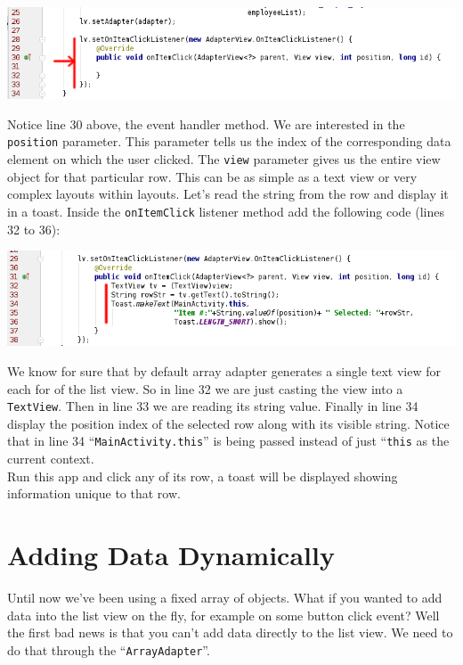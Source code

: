 \begin{center}
	\includegraphics[scale=0.4]{chapters/ch10/images/28}
\end{center}

Notice line 30 above, the event handler method. We are interested in the \texttt{position} parameter. This parameter tells us the index of the corresponding data element on which the user clicked. The \texttt{view} parameter gives us the entire view object for that particular row. This can be as simple as a text view or very complex layouts within layouts. Let's read the string from the row and display it in a toast. Inside the \texttt{onItemClick} listener method add the following code (lines 32 to 36):

\begin{center}
	\includegraphics[scale=0.4]{chapters/ch10/images/29}
\end{center}

We know for sure that by default array adapter generates a single text view for each for of the list view. So in line 32 we are just casting the view into a \texttt{TextView}. Then in line 33 we are reading its string value. Finally in line 34 display the position index of the selected row along with its visible string. Notice that in line 34 ``\texttt{MainActivity.this}'' is being passed instead of just ``\texttt{this} as the current context. \\

Run this app and click any of its row, a toast will be displayed showing information unique to that row.

\section{Adding Data Dynamically}

Until now we've been using a fixed array of objects. What if you wanted to add data into the list view on the fly, for example on some button click event? Well the first bad news is that you can't add data directly to the list view. We need to do that through the ``\texttt{ArrayAdapter}''. \\

